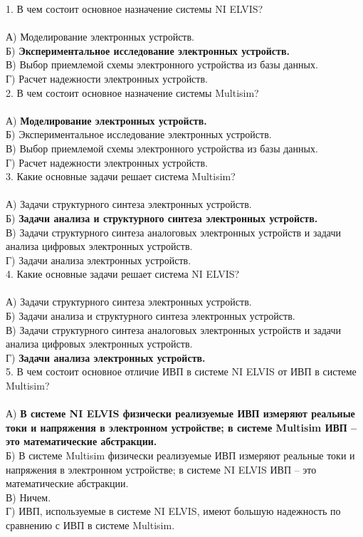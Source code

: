 1. В чем состоит основное назначение системы NI ELVIS?\\\\
А) Моделирование электронных устройств.\\
Б) \textbf{Экспериментальное исследование электронных устройств.}\\
В) Выбор приемлемой схемы электронного устройства из базы данных.\\
Г) Расчет надежности электронных устройств.\\

2. В чем состоит основное назначение системы Multisim?\\\\
А) \textbf{Моделирование электронных устройств.}\\
Б) Экспериментальное исследование электронных устройств.\\
В) Выбор приемлемой схемы электронного устройства из базы данных.\\
Г) Расчет надежности электронных устройств.\\

3. Какие основные задачи решает система Multisim?\\\\
А) Задачи структурного синтеза электронных устройств.\\
Б) \textbf{Задачи анализа и структурного синтеза электронных устройств.}\\
В) Задачи структурного синтеза аналоговых электронных устройств и задачи анализа цифровых электронных устройств.\\
Г) Задачи анализа электронных устройств.\\

4. Какие основные задачи решает система NI ELVIS?\\\\
А) Задачи структурного синтеза электронных устройств.\\
Б) Задачи анализа и структурного синтеза электронных устройств.\\
В) Задачи структурного синтеза аналоговых электронных устройств и задачи анализа цифровых электронных устройств.\\
Г) \textbf{Задачи анализа электронных устройств.}\\

5. В чем состоит основное отличие ИВП в системе NI ELVIS от ИВП в системе Multisim?\\\\
А) \textbf{В системе NI ELVIS физически реализуемые ИВП измеряют реальные токи и напряжения в электронном устройстве; в системе Multisim ИВП – это математические абстракции.}\\    
Б) В системе Multisim физически реализуемые ИВП измеряют реальные токи и напряжения в электронном устройстве; в системе NI ELVIS ИВП – это математические абстракции.\\    
В) Ничем.\\
Г) ИВП, используемые в системе NI ELVIS, имеют большую надежность по сравнению с ИВП в системе Multisim.\\

